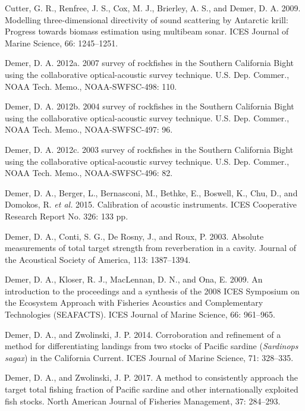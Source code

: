 \documentclass[]{article}
\begin{document}
\leavevmode\hypertarget{ref-Cutter2009}{}%
Cutter, G. R., Renfree, J. S., Cox, M. J., Brierley, A. S., and Demer, D. A. 2009. Modelling three-dimensional directivity of sound scattering by Antarctic krill: Progress towards biomass estimation using multibeam sonar. ICES Journal of Marine Science, 66: 1245--1251.

\leavevmode\hypertarget{ref-Demer2012b}{}%
Demer, D. A. 2012a. 2007 survey of rockfishes in the Southern California Bight using the collaborative optical-acoustic survey technique. U.S. Dep. Commer., NOAA Tech. Memo., NOAA-SWFSC-498: 110.

\leavevmode\hypertarget{ref-Demer2012c}{}%
Demer, D. A. 2012b. 2004 survey of rockfishes in the Southern California Bight using the collaborative optical-acoustic survey technique. U.S. Dep. Commer., NOAA Tech. Memo., NOAA-SWFSC-497: 96.

\leavevmode\hypertarget{ref-Demer2012d}{}%
Demer, D. A. 2012c. 2003 survey of rockfishes in the Southern California Bight using the collaborative optical-acoustic survey technique. U.S. Dep. Commer., NOAA Tech. Memo., NOAA-SWFSC-496: 82.

\leavevmode\hypertarget{ref-Demer2015}{}%
Demer, D. A., Berger, L., Bernasconi, M., Bethke, E., Boswell, K., Chu, D., and Domokos, R. \emph{et al.} 2015. Calibration of acoustic instruments. ICES Cooperative Research Report No. 326: 133 pp.

\leavevmode\hypertarget{ref-Demer2003}{}%
Demer, D. A., Conti, S. G., De Rosny, J., and Roux, P. 2003. Absolute measurements of total target strength from reverberation in a cavity. Journal of the Acoustical Society of America, 113: 1387--1394.

\leavevmode\hypertarget{ref-Demer2009}{}%
Demer, D. A., Kloser, R. J., MacLennan, D. N., and Ona, E. 2009. An introduction to the proceedings and a synthesis of the 2008 ICES Symposium on the Ecosystem Approach with Fisheries Acoustics and Complementary Technologies (SEAFACTS). ICES Journal of Marine Science, 66: 961--965.

\leavevmode\hypertarget{ref-Demer2014}{}%
Demer, D. A., and Zwolinski, J. P. 2014. Corroboration and refinement of a method for differentiating landings from two stocks of Pacific sardine (\emph{Sardinops sagax}) in the California Current. ICES Journal of Marine Science, 71: 328--335.

\leavevmode\hypertarget{ref-Demer2017}{}%
Demer, D. A., and Zwolinski, J. P. 2017. A method to consistently approach the target total fishing fraction of Pacific sardine and other internationally exploited fish stocks. North American Journal of Fisheries Management, 37: 284--293.
\end{document}
